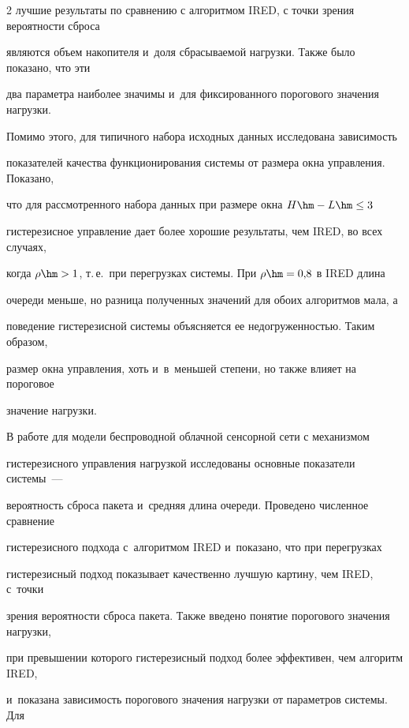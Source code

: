 \begin{multicols}{2}
лучшие результаты по сравнению с алгоритмом IRED, с точки зрения вероятности сброса 


являются объем накопителя и~доля сбрасываемой нагрузки. Также было показано, что эти 


два па\-ра\-мет\-ра наиболее значимы и~для фиксированного порогового значения нагрузки.


  


  Помимо этого, для типичного набора исходных данных исследована зависимость 


показателей качества функционирования системы от размера окна управления. Показано, 


что для рассмотренного набора данных при размере окна $H\hm- L\hm \leq 3$ 


гистерезисное управление дает более хорошие результаты, чем IRED, во всех случаях, 


когда $\rho\hm> 1$, т.\,е.\ при перегрузках системы. При $\rho\hm= 0{,}8$ в IRED длина 


очереди меньше, но разница полученных значений для обоих алгоритмов мала, а 


поведение гистерезисной сис\-те\-мы объясняется ее недогруженностью. Таким образом, 


размер окна управ\-ле\-ния, хоть и~в~меньшей степени, но также влияет на пороговое 


значение нагрузки.


  


  В работе для модели беспроводной облачной сенсорной сети с механизмом 


гистерезисного управ\-ле\-ния нагрузкой исследованы основные показатели сис\-те\-мы~--- 


вероятность сброса пакета и~средняя длина очереди. Проведено численное сравнение 


гистерезисного подхода с~алгоритмом IRED и~показано, что при перегрузках 


гистерезисный подход показывает качественно лучшую картину, чем IRED, с~точки 


зрения вероятности сброса пакета. Также введено понятие порогового значения нагрузки, 


при превышении которого гистерезисный подход более эффективен, чем алгоритм IRED, 


и~показана за\-ви\-си\-мость порогового значения нагрузки от па\-ра\-мет\-ров сис\-те\-мы. Для 



\end{multicols}
